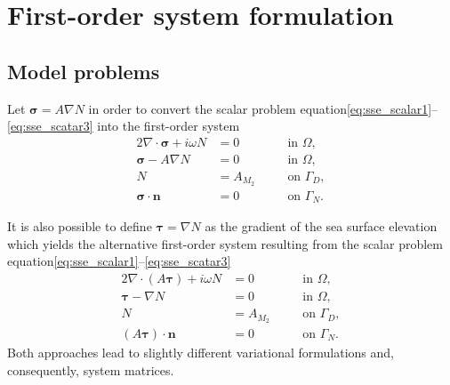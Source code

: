 \documentclass[11pt,a4paper]{article}
\begin{document}
\section{First-order system formulation}

\subsection{Model problems}
Let $\boldsymbol{\sigma}=A\nabla N$ in order to convert the scalar problem equation\eqref{eq:sse_scalar1}--\eqref{eq:sse_scatar3} into the first-order system
\begin{alignat}{2}
\nabla\cdot\boldsymbol{\sigma}+i\omega N&=0  \quad && \text{in } \Omega,
\label{eq:sse_system1}\\
\boldsymbol{\sigma}-A\nabla N&=0 \quad && \text{in } \Omega,
\label{eq:sse_system2}\\
N&=A_{M_2} \quad && \text{on } \Gamma_D,
\label{eq:sse_system3}\\
\boldsymbol{\sigma}\cdot\mathbf{n}&=0 \quad && \text{on } \Gamma_N.
\label{eq:sse_system4}
\end{alignat}

It is also possible to define $\boldsymbol{\tau}=\nabla N$ as the gradient of the sea surface elevation which yields the alternative first-order system resulting from the scalar problem equation\eqref{eq:sse_scalar1}--\eqref{eq:sse_scatar3}
\begin{alignat}{2}
\nabla\cdot(A\boldsymbol{\tau})+i\omega N&=0  \quad && \text{in } \Omega,
\label{eq:sse_system5}\\
\boldsymbol{\tau}-\nabla N&=0 \quad && \text{in } \Omega,
\label{eq:sse_system6}\\
N&=A_{M_2} \quad && \text{on } \Gamma_D,
\label{eq:sse_system7}\\
(A\boldsymbol{\tau})\cdot\mathbf{n}&=0 \quad && \text{on } \Gamma_N.
\label{eq:sse_system8}
\end{alignat}
Both approaches lead to slightly different variational formulations and, consequently, system matrices.
\end{document}
